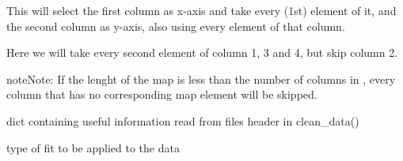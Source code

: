 \documentclass[letterpaper,10pt,english]{sphinxmanual}
\begin{document}
\begin{fulllineitems}
\begin{fulllineitems}
This will select the first column as x-axis and take every (1st)
element of it, and the second column as y-axis, also using every
element of that column.

\begin{sphinxVerbatim}[commandchars=\\\{\}]
  \PYG{p}{[}\PYG{p}{]}
\end{sphinxVerbatim}

Here we will take every second element of column 1, 3 and 4, but
skip column 2.

\begin{sphinxadmonition}{note}{Note:}
If the lenght of the map is less than the number of columns in , every column that has no corresponding map element will be skipped.
\end{sphinxadmonition}

\end{fulllineitems}


\begin{fulllineitems}
\label{\detokenize{measurement:measurement.Measurement.settings}}
dict containing useful information read from files header in clean\_data()

\end{fulllineitems}


\begin{fulllineitems}
\label{\detokenize{measurement:measurement.Measurement.type_of_fit}}
type of fit to be applied to the data

\end{fulllineitems}


\end{fulllineitems}
\end{document}
